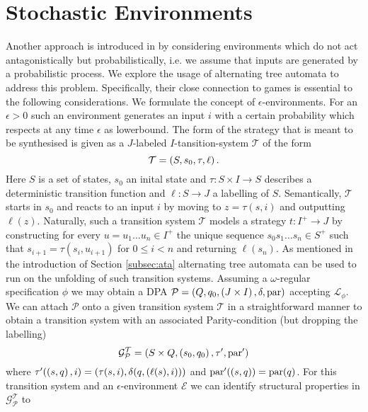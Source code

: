 \section{Stochastic Environments}
Another approach is introduced in \cite{SynProbEnv} by considering environments
which do not act antagonistically but probabilistically, i.e. we assume that
inputs are generated by a probabilistic process. We explore the usage of
alternating tree automata to address this problem. Specifically, their close
connection to games is essential to the following considerations. We formulate
the concept of $\epsilon$-environments. For an $\epsilon > 0$ such an
environment generates an input $i$ with a certain probability which respects at
any time $\epsilon$ as lowerbound. The form of the strategy that is meant to be
synthesised is given as a $J$-labeled $I$-tansition-system $\mathcal{T}$ of the
form
\begin{equation*}
  \mathcal{T} = \left(S, s_{0}, \tau, \ell\right).
\end{equation*}
Here $S$ is a set of states, $s_{0}$ an inital state and
$\tau:S\times I\rightarrow S$ describes a deterministic transition function and
$\ell:S\rightarrow J$ a labelling of $S$. Semantically, $\mathcal{T}$ starts in
$s_{0}$ and reacts to an input $i$ by moving to $z = \tau(s,i)$ and outputting
$\ell(z)$. Naturally, such a transition system $\mathcal{T}$ models a strategy
$t:I^{+}\rightarrow J$ by constructing for every
$u = u_{1}\dots u_{n}\in I^{+}$ the unique sequence
$s_{0}s_{1}\dots s_{n}\in S^{+}$ such that $s_{i+1} = \tau(s_{i}, u_{i+1})$ for
$0\leq i<n$ and returning $\ell(s_{n})$. As mentioned in the introduction of
Section \ref{subsec:ata} alternating tree automata can be used to run on the
unfolding of such transition systems. Assuming a $\omega$-regular specification 
$\phi$ we may obtain a \ac{DPA}
$\mathcal{P} = \left(Q, q_{0}, \left(J\times I\right), \delta, \operatorname{par}\right)$ accepting
$\mathcal{L}_{\phi}$. We can attach $\mathcal{P}$ onto a given transition
system $\mathcal{T}$ in a straightforward manner to obtain a transition system
with an associated Parity-condition (but dropping the labelling)
\begin{equation*}
  \mathcal{G}_{\mathcal{P}}^{\mathcal{T}} = \left(S\times Q,
    \left(s_{0}, q_{0}\right), \tau', \operatorname{par}'\right)
\end{equation*}
where $\tau'(\left(s, q\right), i) = \left(\tau(s, i),
\delta(q, \left(\ell(s), i\right))\right)$ and $\operatorname{par}'(\left(s, q\right)) = \operatorname{par}(q)$. For
this transition system and an $\epsilon$-environment $\mathcal{E}$ we can
identify structural properties in $\mathcal{G}_{\mathcal{P}}^{\mathcal{T}}$ to

